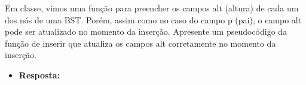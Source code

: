 Em classe, vimos uma função para preencher os campos alt (altura) de cada um dos nós de
uma BST. Porém, assim como no caso do campo p (pai), o campo alt pode ser atualizado no
momento da inserção. Apresente um pseudocódigo da função de inserir que atualiza os campos
alt corretamente no momento da inserção.

\begin{itemize}
	\item \textbf{Resposta:}
\end{itemize}